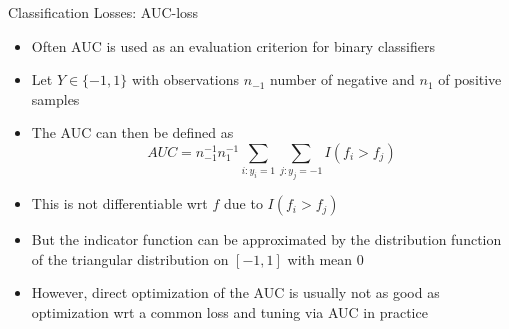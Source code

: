 \begin{vbframe}{Classification Losses: AUC-loss}

\begin{itemize}
\item Often AUC is used as an evaluation criterion for binary classifiers
\item Let $Y \in \{-1, 1\}$ with observations $n_{-1}$ number of negative and $n_{1}$ of positive samples %
\item The AUC can then be defined as
$$AUC = n_{-1}^{-1} n_1^{-1} \sum_{i: y_i = 1} \sum_{j: y_j = -1} I(f_i > f_j)$$
\item This is not differentiable wrt $f$ due to $I(f_i > f_j)$
\item But the indicator function can be approximated by the distribution function of the triangular distribution on $[-1, 1]$ with mean $0$
\item However, direct optimization of the AUC is usually not as good as optimization wrt a common loss and tuning via AUC in practice 

\end{itemize}
\end{vbframe}


\endlecture

